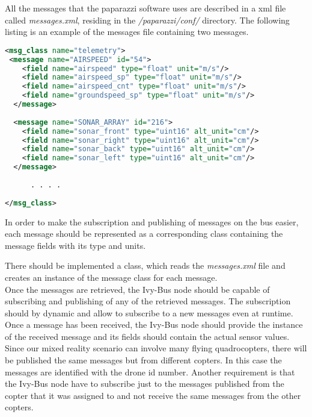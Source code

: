 All the messages that the paparazzi software uses are described in a xml file called \textit{messages.xml}, residing in the \textit{/paparazzi/conf/} directory. The following listing is an example of the messages file containing two messages.

\begin{lstlisting}[basicstyle=\tiny, caption={Message Xml definition}, label={lst:MessageXml}, language = Xml]
<msg_class name="telemetry">
 <message name="AIRSPEED" id="54">
    <field name="airspeed" type="float" unit="m/s"/>
    <field name="airspeed_sp" type="float" unit="m/s"/>
    <field name="airspeed_cnt" type="float" unit="m/s"/>
    <field name="groundspeed_sp" type="float" unit="m/s"/>
  </message>
  
  <message name="SONAR_ARRAY" id="216">
	<field name="sonar_front" type="uint16" alt_unit="cm"/>
	<field name="sonar_right" type="uint16" alt_unit="cm"/>
	<field name="sonar_back" type="uint16" alt_unit="cm"/>
	<field name="sonar_left" type="uint16" alt_unit="cm"/>
  </message>
	
	  . . . . 
	  
</msg_class>
\end{lstlisting}

In order to make the subscription and publishing of messages on the bus easier, each message should be represented as a corresponding class containing the message fields with its type and units.

There should be implemented a class, which reads the \textit{messages.xml} file and creates an instance of the message class for each message. \\
Once the messages are retrieved, the Ivy-Bus node should be capable of subscribing and publishing of any of the retrieved messages. The subscription should by dynamic and allow to subscribe to a new messages even at runtime. \\
Once a message has been received, the Ivy-Bus node should provide the instance of the received message and its fields should contain the actual sensor values.\\
Since our mixed reality scenario can involve many flying quadrocopters, there will be published the same messages but from different copters. In this case the messages are identified with the drone id number.
Another requirement is that the Ivy-Bus node have to subscribe just to the messages published from the copter that it was assigned to and not receive the same messages from the other copters.

